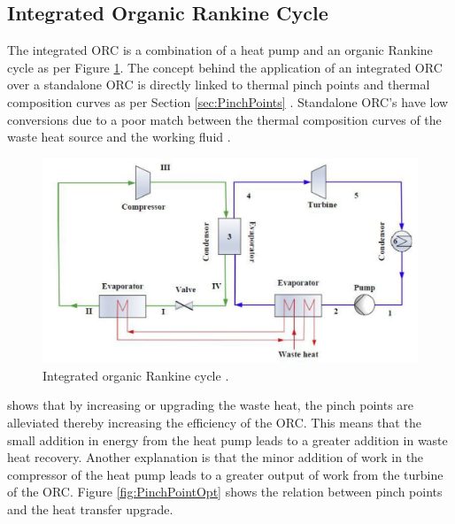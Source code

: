 \documentclass[a4paper,12pt]{article}
\begin{document}
\subsection{Integrated Organic Rankine Cycle}
The integrated ORC is a combination of a heat pump and an organic Rankine cycle as per Figure \ref{fig:intORC}. The concept behind the application of an integrated ORC over a standalone ORC is directly linked to thermal pinch points and thermal composition curves as per Section \ref{sec:PinchPoints} \parencite{YU2018330}. Standalone ORC's have low conversions due to a poor match between the thermal composition curves of the waste heat source and the working fluid \parencite{MacchiEnnio}. 

 \begin{figure}[H]
  \centering
  \includegraphics[scale = 0.65]{Images/IntORC.pdf}
  \caption{Integrated organic Rankine cycle \parencite{YU2018330}.}
  \label{fig:intORC}
\end{figure}

\textcite{YU2018330} shows that by increasing or upgrading the waste heat, the pinch points are alleviated thereby increasing the efficiency of the ORC. This means that the small addition in energy from the heat pump leads to a greater addition in waste heat recovery. Another explanation is that the minor addition of work in the compressor of the heat pump leads to a greater output of work from the turbine of the ORC. Figure \ref{fig:PinchPointOpt} shows the relation between pinch points and the heat transfer upgrade.
\end{document}
